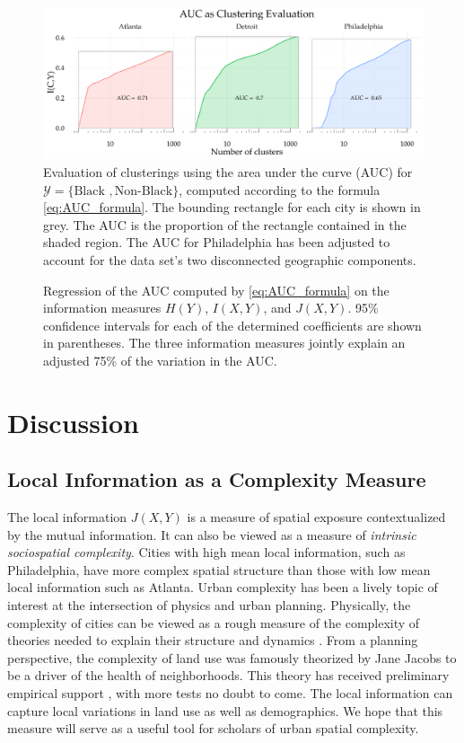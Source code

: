 \documentclass[9pt,twocolumn,twoside]{pnas-new}
\begin{document}
	\begin{figure} 
			\includegraphics[width=\linewidth]{figs/AUC_illustration.pdf}
			\caption{
				Evaluation of clusterings using the area under the curve (AUC) for $\mathcal{Y} = \{\text{Black }, \text{Non-Black}\}$, computed according to the formula \eqref{eq:AUC_formula}. 
				The bounding rectangle for each city is shown in grey. 
				The AUC is the proportion of the rectangle contained in the shaded region. 
				The AUC for Philadelphia has been adjusted to account for the data set's two disconnected geographic components.
			} \label{fig:AUC}
	\end{figure}
	\begin{figure}
		\centering
		
		\caption{
			Regression of the AUC computed by \eqref{eq:AUC_formula} on the information measures $H(Y)$, $I(X,Y)$, and $J(X,Y)$. 
			95\% confidence intervals for each of the determined coefficients are shown in parentheses. 
			The three information measures jointly explain an adjusted 75\% of the variation in the AUC. 
		}\label{fig:regression}
	\end{figure}

\section*{Discussion}
	
	\subsection*{Local Information as a Complexity Measure}
		The local information $J(X,Y)$ is a measure of spatial exposure contextualized by the mutual information. It can also be viewed as a measure of \emph{intrinsic sociospatial complexity}. Cities with high mean local information, such as Philadelphia, have more complex spatial structure than those with low mean local information such as Atlanta. Urban complexity has been a lively topic of interest at the intersection of physics and urban planning. Physically, the complexity of cities can be viewed as a rough measure of the complexity of theories needed to explain their structure and dynamics \cite{Bettencourt2015}. From a planning perspective, the complexity of land use was famously theorized by Jane Jacobs \cite{Jacobs1992} to be a driver of the health of neighborhoods. This theory has received preliminary empirical support \cite{DeNadai2016a}, with more tests no doubt to come. The local information can capture local variations in land use as well as demographics. We hope that this measure will serve as a useful tool for scholars of urban spatial complexity.  
\end{document}
